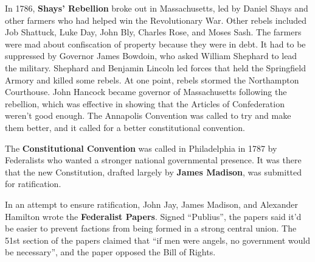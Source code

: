 In 1786, \textbf{Shays' Rebellion} broke out in Massachusetts,
led by Daniel Shays and other farmers who had helped win the Revolutionary War.
Other rebels included Job Shattuck, Luke Day, John Bly, Charles Rose, and Moses Sash.
The farmers were mad about confiscation of property because they were in debt.
It had to be suppressed by Governor James Bowdoin, who asked William Shephard to lead the military.
Shephard and Benjamin Lincoln led forces that held the Springfield Armory and killed some rebels.
At one point, rebels stormed the Northampton Courthouse.
John Hancock became governor of Massachusetts following the rebellion,
which was effective in showing that the Articles of Confederation weren't good enough.
The Annapolis Convention was called to try and make them better,
and it called for a better constitutional convention.

The \textbf{Constitutional Convention} was called in Philadelphia in 1787
by Federalists who wanted a stronger national governmental presence.
It was there that the new Constitution, drafted largely by \textbf{James Madison},
was submitted for ratification.

In an attempt to ensure ratification,
John Jay, James Madison, and Alexander Hamilton wrote the \textbf{Federalist Papers}.
Signed ``Publius'', the papers said it'd be easier to prevent factions from being formed in a strong central union.
The 51st section of the papers claimed that ``if men were angels, no government would be necessary'',
and the paper opposed the Bill of Rights.
